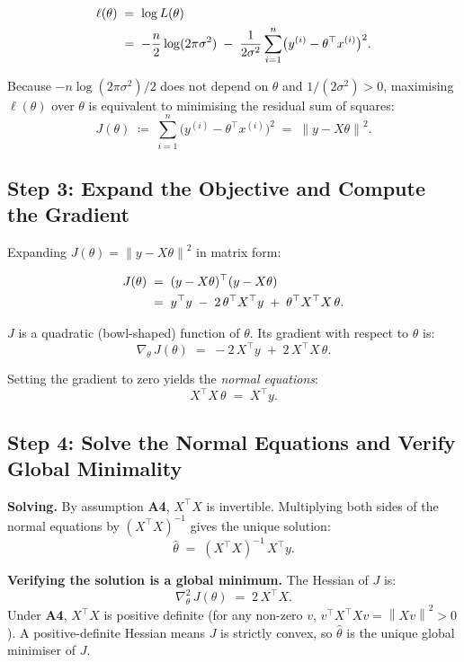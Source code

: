 \documentclass[11pt]{article}
\theoremstyle{definition}
\theoremstyle{remark}
\newcommand{\norm}[1]{\left\lVert#1\right\rVert}
\newcommand{\T}{^{\top}}
\begin{document}
\begin{align}
    \ell(\theta)
    &\;=\; \log L(\theta) \notag \\
    &\;=\; -\frac{n}{2}\log(2\pi\sigma^{2})
           \;-\; \frac{1}{2\sigma^{2}}
                 \sum_{i=1}^{n}\bigl(y^{(i)} - \theta\T x^{(i)}\bigr)^{2}.
    \label{eq:loglik}
\end{align}

Because $-n\log(2\pi\sigma^{2})/2$ does not depend on $\theta$ and
$1/(2\sigma^{2}) > 0$, maximising $\ell(\theta)$ over $\theta$ is equivalent to
minimising the residual sum of squares:
\[
    J(\theta)
    \;\coloneqq\;
    \sum_{i=1}^{n}\bigl(y^{(i)} - \theta\T x^{(i)}\bigr)^{2}
    \;=\;
    \norm{y - X\theta}^{2}.
\]

\subsection{Step 3: Expand the Objective and Compute the Gradient}

Expanding $J(\theta) = \norm{y - X\theta}^{2}$ in matrix form:

\begin{align}
    J(\theta)
    &\;=\; (y - X\theta)\T(y - X\theta) \notag \\
    &\;=\; y\T y \;-\; 2\,\theta\T X\T y \;+\; \theta\T X\T X\,\theta.
    \label{eq:Jexpanded}
\end{align}

$J$ is a quadratic (bowl-shaped) function of $\theta$.  Its gradient with
respect to $\theta$ is:
\[
    \nabla_{\theta}\, J(\theta)
    \;=\; -2\,X\T y \;+\; 2\,X\T X\,\theta.
\]

Setting the gradient to zero yields the \emph{normal equations}:
\[
    X\T X\,\theta \;=\; X\T y. \tag{Normal Equations}
\]

\subsection{Step 4: Solve the Normal Equations and Verify Global Minimality}

\textbf{Solving.}
By assumption \textbf{A4}, $X\T X$ is invertible.  Multiplying both sides of
the normal equations by $(X\T X)^{-1}$ gives the unique solution:
\[
    \hat{\theta} \;=\; (X\T X)^{-1}\, X\T y.
\]

\textbf{Verifying the solution is a global minimum.}
The Hessian of $J$ is:
\[
    \nabla^{2}_{\theta}\, J(\theta)
    \;=\; 2\,X\T X.
\]
Under \textbf{A4}, $X\T X$ is positive definite (for any non-zero $v$,
$v\T X\T X v = \norm{Xv}^{2} > 0$).  A positive-definite Hessian means $J$ is
strictly convex, so $\hat{\theta}$ is the unique global minimiser of $J$.
\end{document}

